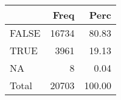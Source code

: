 
\begin{tabular}[t]{lrr}
\toprule
  & Freq & Perc\\
\midrule
FALSE & 16734 & 80.83\\
TRUE & 3961 & 19.13\\
NA & 8 & 0.04\\
Total & 20703 & 100.00\\
\bottomrule
\end{tabular}